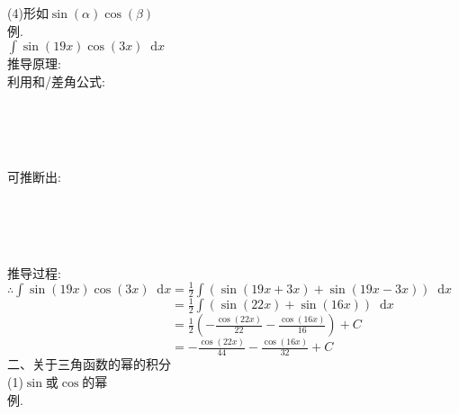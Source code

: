\documentclass[UTF8, fontset=ubuntu]{ctexart}
\newcommand*{\dif}{\mathop{}\!\mathrm{d}}
\begin{document}
(4)形如$\sin(\alpha)\cos(\beta)$\\
例.\\
$\displaystyle\int\sin(19x)\cos(3x)\dif x$\\
推导原理:\\
利用和/差角公式:\\[-4ex]
\begin{center}
    \\[2ex]
    \\[2ex]
    \\[2ex]
\end{center}\vspace{1ex}
可推断出:\\[-4ex]
\begin{center}
	\\[2ex]
	\\[2ex]
	\\[2ex]
\end{center}\newpage
推导过程:\\
$\displaystyle\therefore\int\sin(19x)\cos(3x)\dif x=\frac{1}{2}\int(\sin(19x+3x)+\sin(19x-3x))\dif x$\\
$\displaystyle\phantom{\therefore\int\sin(19x)\cos(3x)\dif x}=\frac{1}{2}\int(\sin(22x)+\sin(16x))\dif x$\\
$\displaystyle\phantom{\therefore\int\sin(19x)\cos(3x)\dif x}=\frac{1}{2}\left(-\frac{\cos(22x)}{22}-\frac{\cos(16x)}{16}\right)+C$\\
$\displaystyle\phantom{\therefore\int\sin(19x)\cos(3x)\dif x}=-\frac{\cos(22x)}{44}-\frac{\cos(16x)}{32}+C$\\[4ex]

二、关于三角函数的幂的积分\\
(1)$\sin$或$\cos$的幂\\
例.\\
\end{document}
